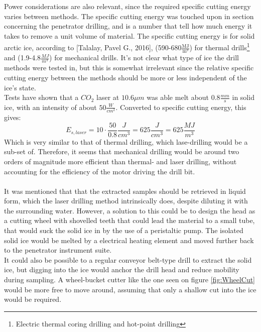 Power considerations are also relevant, since the required specific cutting energy varies between methods. The specific cutting energy was touched upon in section concerning the penetrator drilling, and is a number that tell how much energy it takes to remove a unit volume of material. The specific cutting energy is for solid arctic ice, according to [Talalay, Pavel G., 2016]\cite{IceDrill}, (590-680$\mathrm{\frac{MJ}{m^3}}$) for thermal drills\footnote{Electric thermal coring drilling and hot-point drilling } and (1.9-4.8$\frac{MJ}{m^3}$) for mechanical drills. It's not clear what type of ice the drill methods were tested in, but this is somewhat irrelevant since the relative specific cutting energy between the methods should be more or less independent of the ice's state.\\ 
Tests have shown that a $CO_2$ laser at $10.6\mu m$ was able melt about $0.8\frac{mm}{s}$ in solid ice, with an intensity of about $50\frac{W}{cm^2}$. Converted to specific cutting energy, this gives:
\begin{equation}
E_{s,laser}=10\cdot\frac{50}{0.8}\frac{J}{cm^3}=625\frac{J}{cm^3}=625\frac{MJ}{m^3}
\end{equation} 
Which is very similar to that of thermal drilling, which lase-drilling would be a sub-set of. Therefore, it seems that mechanical drilling would be around two orders of magnitude more efficient than thermal- and laser drilling, without accounting for the efficiency of the motor driving the drill bit. \\
\\
It was mentioned that that the extracted samples should be retrieved in liquid form, which the laser drilling method intrinsically does, despite diluting it with the surrounding water. However, a solution to this could be to design the head as a cutting wheel with shovelled teeth that could lead the material to a small tube, that would suck the solid ice in by the use of a peristaltic pump. The isolated solid ice would be melted by a electrical heating element and moved further back to the penetrator instrument suite. \\
It could also be possible to a regular conveyor belt-type drill to extract the solid ice, but digging into the ice would anchor the drill head and reduce mobility during sampling. A wheel-bucket cutter like the one seen on figure \ref{fig:WheelCut}  would be more free to move around, assuming that only a shallow cut into the ice would be required.  
